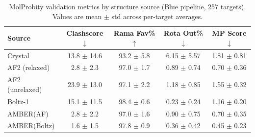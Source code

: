 \begin{table}[htbp]
\centering
\caption{MolProbity validation metrics by structure source (Blue pipeline, 257 targets). Values are mean $\pm$ std across per-target averages.}
\label{tab:molprobity-blue}
\begin{tabular}{lcccc}
\toprule
Source & Clashscore$\downarrow$ & Rama Fav\%$\uparrow$ & Rota Out\%$\downarrow$ & MP Score$\downarrow$ \\
\midrule
  Crystal & 13.8 $\pm$ 14.6 & 93.2 $\pm$ 5.8 & 6.15 $\pm$ 5.57 & 1.81 $\pm$ 0.81 \\
  \midrule
  AF2 (relaxed) & 2.8 $\pm$ 2.3 & 97.0 $\pm$ 1.7 & 0.89 $\pm$ 0.74 & 0.70 $\pm$ 0.36 \\
  AF2 (unrelaxed) & 23.9 $\pm$ 13.0 & 97.1 $\pm$ 2.2 & 1.18 $\pm$ 0.85 & 1.55 $\pm$ 0.32 \\
  Boltz-1 & 15.1 $\pm$ 11.5 & 98.4 $\pm$ 0.6 & 0.23 $\pm$ 0.24 & 1.16 $\pm$ 0.20 \\
  AMBER(AF) & 2.8 $\pm$ 2.2 & 97.0 $\pm$ 1.6 & 0.90 $\pm$ 0.75 & 0.70 $\pm$ 0.35 \\
  AMBER(Boltz) & 1.6 $\pm$ 1.5 & 97.8 $\pm$ 0.9 & 0.36 $\pm$ 0.42 & 0.45 $\pm$ 0.23 \\
\bottomrule
\end{tabular}
\end{table}